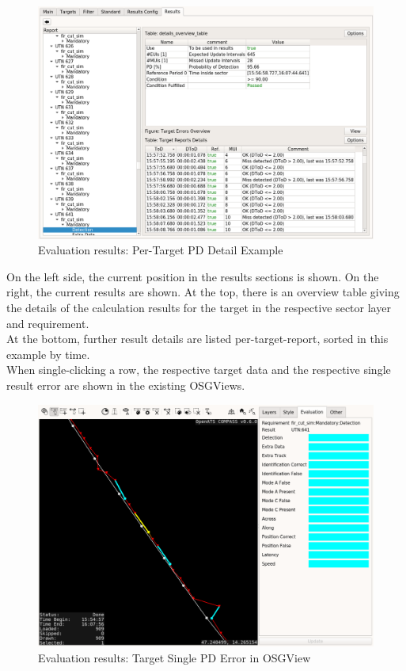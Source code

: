 \begin{figure}[H]
  \hspace*{-2cm}
    \includegraphics[width=18cm,frame]{figures/eval_results_target_det_example.png}
  \caption{Evaluation results: Per-Target PD Detail Example}
\end{figure}

On the left side, the current position in the results sections is shown. On the right, the current results are shown. At the top, there is an overview table giving the details of the calculation results for the target in the respective sector layer and requirement. \\

At the bottom, further result details are listed per-target-report, sorted in this example by time. \\

When single-clicking a row, the respective target data and the respective single result error are shown in the existing OSGViews.

\begin{figure}[H]
  \hspace*{-2.5cm}
    \includegraphics[width=19cm]{figures/eval_results_pd_single_tr_osgview.png}
  \caption{Evaluation results: Target Single PD Error in OSGView}
\end{figure}


